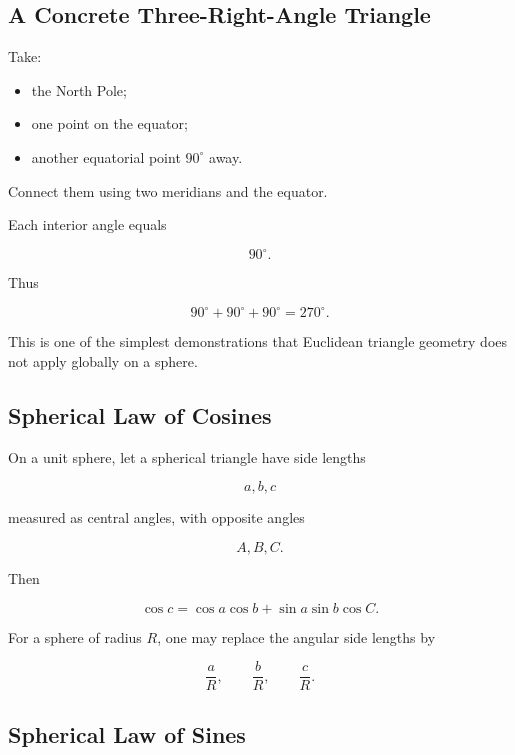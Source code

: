 \subsection{A Concrete Three-Right-Angle Triangle}
\label{subsec:three-right-angle-triangle}

Take:

\begin{itemize}
    \item the North Pole;
    \item one point on the equator;
    \item another equatorial point \(90^\circ\) away.
\end{itemize}

Connect them using two meridians and the equator.

Each interior angle equals

\[
90^\circ.
\]

Thus

\[
\boxed{
90^\circ+90^\circ+90^\circ=270^\circ.
}
\]

This is one of the simplest demonstrations that Euclidean triangle geometry
does not apply globally on a sphere.

\subsection{Spherical Law of Cosines}
\label{subsec:spherical-law-cosines}

On a unit sphere, let a spherical triangle have side lengths

\[
a,b,c
\]

measured as central angles, with opposite angles

\[
A,B,C.
\]

Then

\[
\boxed{
\cos c
=
\cos a\cos b
+
\sin a\sin b\cos C.
}
\]

For a sphere of radius \(R\), one may replace the angular side lengths by

\[
\frac{a}{R},
\qquad
\frac{b}{R},
\qquad
\frac{c}{R}.
\]

\subsection{Spherical Law of Sines}
\label{subsec:spherical-law-sines}

